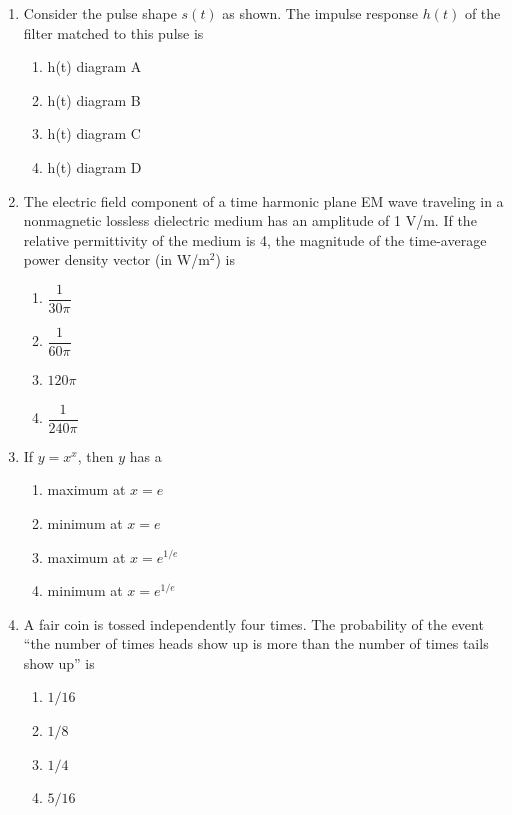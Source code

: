 \documentclass[journal,12pt,onecolumn]{IEEEtran}
\begin{document}
\begin{enumerate}
\item Consider the pulse shape $s(t)$ as shown. The impulse response $h(t)$ of the filter matched to this pulse is
\begin{multicols}{2}
\begin{enumerate}
\item h(t) diagram A
\item h(t) diagram B
\item h(t) diagram C
\item h(t) diagram D
\end{enumerate}
\end{multicols}

\item The electric field component of a time harmonic plane EM wave traveling in a nonmagnetic lossless dielectric medium has an amplitude of 1 V/m. If the relative permittivity of the medium is 4, the magnitude of the time-average power density vector (in W/m$^2$) is
\begin{multicols}{2}
\begin{enumerate}
\item $\dfrac{1}{30\pi}$
\item $\dfrac{1}{60\pi}$
\item $120\pi$
\item $\dfrac{1}{240\pi}$
\end{enumerate}
\end{multicols}

\item If $y = x^x$, then $y$ has a
\begin{multicols}{2}
\begin{enumerate}
\item maximum at $x=e$
\item minimum at $x=e$
\item maximum at $x=e^{1/e}$
\item minimum at $x=e^{1/e}$
\end{enumerate}
\end{multicols}

\item A fair coin is tossed independently four times. The probability of the event ``the number of times heads show up is more than the number of times tails show up'' is
\begin{multicols}{2}
\begin{enumerate}
\item $1/16$
\item $1/8$
\item $1/4$
\item $5/16$
\end{enumerate}
\end{multicols}


\end{enumerate}
\end{document}
